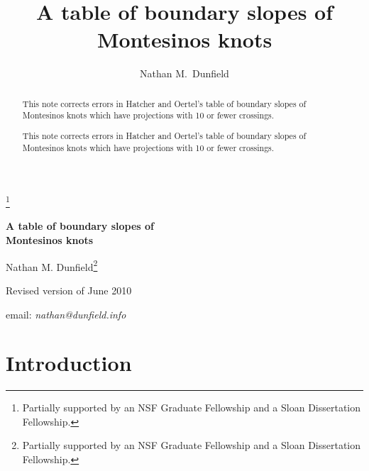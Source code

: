 \documentclass{elsart}
\begin{document}
\iftopology

\begin{frontmatter}
\title{A table of boundary slopes of Montesinos knots}
\author{ Nathan M.~Dunfield }
\address{ Department of Mathematics, University of Illinois, Urbana, IL 61801, USA, e-mail: nathan@dunfield.info}

\thanks[NSFSloan]{Partially supported by an NSF Graduate Fellowship and a
  Sloan Dissertation Fellowship.}

\begin{abstract}
     This note corrects errors in Hatcher and Oertel's table of boundary 
     slopes of Montesinos knots which have projections with 10 or fewer
     crossings.
\end{abstract}
\end{frontmatter} 


\else

    \begin{center}
   {\Large \textbf{A table of boundary slopes of \\
    Montesinos knots\\}}

    \bigskip

    {\large  Nathan M. Dunfield\footnote{Partially supported by
    an NSF Graduate Fellowship and a Sloan Dissertation Fellowship.}}


     \medskip

     {Revised version of June 2010}

     \medskip

     {email: \sl nathan@dunfield.info}

     \end{center}

    \begin{abstract}
    This note corrects errors in Hatcher and Oertel's table of boundary 
     slopes of Montesinos knots which have projections with 10 or fewer
     crossings.
     \end{abstract}

\fi

\section{Introduction}
\end{document}
